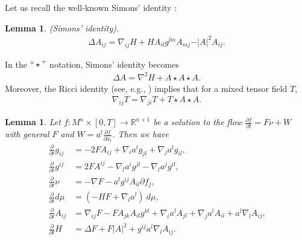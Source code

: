 \documentclass{amsart}
\newtheorem{lemma}[theorem]{Lemma}
\theoremstyle{definition}
\numberwithin{equation}{section}
\begin{document}
Let us recall the well-known Simons' identity \cite{Simon-1968}:
\begin{lemma} {\rm (Simons' identity). }
\begin{align}
\Delta A_{ij}=\nabla_{ij}H+HA_{il}g^{lm}A_{mj}-\vert A\vert ^2
A_{ij}.\nonumber
\end{align}
\end{lemma}

In the $`` \star "$ notation, Simons' identity becomes
\begin{align}
\Delta A=\nabla^{2}  H+A\star A\star A.\nonumber
\end{align}
Moreover, the Ricci identity  (see, e.g., \cite{KS1}) implies that for a mixed
tensor field $T$,
\begin{align}
\label{T}\nabla_{ij} T=\nabla_{ji} T+T\star A\star A.
\end{align}



\begin{lemma} \label{L1}
Let $f: M^n\times [0, T] \rightarrow \mathbb{R}^{n+1}$ be a solution to the flow $ \frac{\partial f}{\partial t}=F \nu+W$ with general $F$ and $W= a^l\frac {\partial f}{\partial x_l }$. Then we have
\begin{align}
\label{L21}\frac{\partial}{\partial t} g_{ij} &= -2F A_{ij}+\nabla_i a^l g_{jl}+\nabla_j a^lg_{il} \mbox{,}\\
\label{L22}\frac{\partial}{\partial t} g^{ij} &= 2F A^{ij}-\nabla_l a^i g^{jl}-\nabla_l a^jg^{il} \mbox{,}\\
\label{L23}\frac{\partial}{\partial t} \nu &=-\nabla F-a^l g^{ij}A_{il}\partial f_j \mbox{,}\\
\label{L24}\frac{\partial}{\partial t} d \mu &= (-HF+\nabla_l a^l)~d\mu  \mbox{,}\\
\label{L25}\frac{\partial}{\partial t} A_{ij}&= \nabla_{ij}F-F A_{jk}A_{il}g^{kl}+
\nabla_i a^lA_{jl}+\nabla_j a^lA_{il}+a^l\nabla_l A_{ij} \mbox{,}\\
\label{L26}\frac{\partial }{\partial t}H&=\Delta F +F \vert A\vert ^2+g^{ij}a^l\nabla_l A_{ij}.
\end{align}
\end{lemma}
\end{document}
